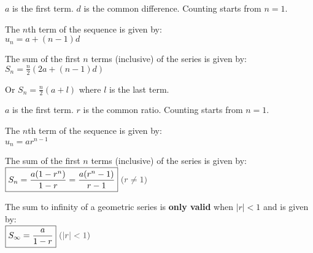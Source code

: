\documentclass[../main.tex]{subfile}
\begin{document}


\vspace{-0.8em}
\begin{center}
	$a$ is the first term. $d$ is the common difference. Counting starts from $n = 1$.

	The $n$th term of the sequence is given by:\\[0.8ex]
	$\boxed{u_n = a + (n - 1)d}$

	The sum of the first $n$ terms (inclusive) of the series is given by:\\[0.8ex]
	$\boxed{S_n = \frac{n}{2} (2a + (n - 1)d)}$

	Or $\boxed{S_n = \frac{n}{2}(a + l)}$ where $l$ is the last term.
\end{center}


\vspace{-0.8em}
\begin{center}
	$a$ is the first term. $r$ is the common ratio. Counting starts from $n = 1$.

	The $n$th term of the sequence is given by:\\[0.8ex]
	$\boxed{u_n = ar^{n - 1}}$

	The sum of the first $n$ terms (inclusive) of the series is given by:\\[0.8ex]
	$\boxed{S_n = \frac{a(1 - r^n)}{1 - r} = \frac{a(r^n - 1)}{r - 1}}\ \constraint{r \ne 1}$

	The sum to infinity of a geometric series is \textbf{only valid} when $|r| < 1$ and is given by:\\[0.8ex]
	$\boxed{S_\infty = \frac{a}{1 - r}}\ \constraint{|r| < 1}$
\end{center}
\end{document}
